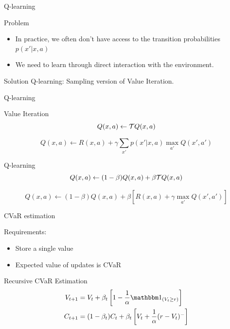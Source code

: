 \documentclass{beamer}
\begin{document}
\begin{frame}{Q-learning}


\begin{alertblock}{Problem}
\begin{itemize}
\item In practice, we often don't have access to the transition probabilities $p(x'|x, a)$
\item We need to learn through direct interaction with the environment.
\end{itemize}
\end{alertblock}

\bigskip
\begin{exampleblock}{Solution}
Q-learning: Sampling version of Value Iteration.
\end{exampleblock}
\end{frame}


\begin{frame}{Q-learning}

\begin{block}{Value Iteration}
$$Q(x, a) \leftarrow \mathcal{T} Q(x, a)$$

$$Q(x, a) \leftarrow R(x, a) + \gamma\sum_{x'}  p(x'|x, a) \max_{a'}Q(x', a')$$
\end{block}

\begin{block}{Q-learning}
$$Q(x, a) \leftarrow (1-\beta)Q(x, a) + \beta \mathcal{T} Q(x, a)$$

$$Q(x, a) \leftarrow (1-\beta)Q(x, a) + \beta \left[R(x, a) + \gamma\max_{a'}Q(x', a')\right]$$
\end{block}
\end{frame}


\begin{frame}{CVaR estimation}

Requirements:
\begin{itemize}
\item Store a single value
\item Expected value of updates is CVaR
\end{itemize}

\begin{block}{Recursive CVaR Estimation}
\begin{align*}
V_{t+1} &= V_{t} + \beta_t \bsquare{1-\dfrac{1}{\alpha}\indicator_{(V_t \ge r)}}\\
C_{t+1} &= (1-\beta_t)C_t + \beta_t \bsquare{V_t + \dfrac{1}{\alpha}(r-V_t)^-}
\end{align*}
\end{block}

\end{frame}
\end{document}
